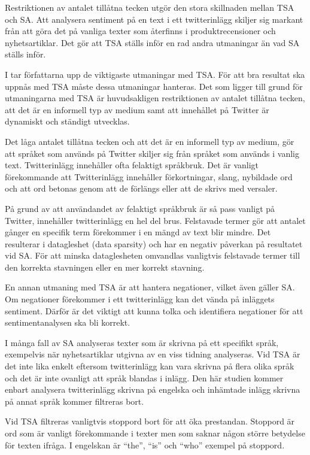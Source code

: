 \documentclass{kaumasters} %
\begin{document}
Restriktionen av antalet tillåtna tecken utgör den stora skillnaden mellan TSA och SA. Att analysera sentiment på en text i ett twitterinlägg skiljer sig markant från att göra det på vanliga texter som återfinns i produktrecensioner och nyhetsartiklar. Det gör att TSA ställs inför en rad andra utmaningar än vad SA ställs inför.

I \cite{TSAsurvey} tar författarna upp de viktigaste utmaningar med TSA. För att bra resultat ska uppnås med TSA måste dessa utmaningar hanteras. Det som ligger till grund för utmaningarna med TSA är huvudsakligen restriktionen av antalet tillåtna tecken, att det är en informell typ av medium samt att innehållet på Twitter är dynamiskt och ständigt utvecklas.

Det låga antalet tillåtna tecken och att det är en informell typ av medium, gör att språket som används på Twitter skiljer sig från språket som används i vanlig text. Twitterinlägg innehåller ofta felaktigt språkbruk. Det är vanligt förekommande att Twitterinlägg innehåller förkortningar, slang,  nybildade ord och att ord betonas genom att de förlängs eller att de skrivs med versaler. 

På grund av att användandet av felaktigt språkbruk är så pass vanligt på Twitter, innehåller twitterinlägg en hel del brus. Felstavade termer gör att antalet gånger en specifik term förekommer i en mängd av text blir mindre. Det resulterar i datagleshet (data sparsity) och har en negativ påverkan på resultatet vid SA. För att minska dataglesheten omvandlas vanligtvis felstavade termer till den korrekta stavningen eller en mer korrekt stavning.

En annan utmaning med TSA är att hantera negationer, vilket även gäller SA. Om negationer förekommer i ett twitterinlägg kan det vända på inläggets sentiment. Därför är det viktigt att kunna tolka och identifiera negationer för att sentimentanalysen ska bli korrekt.

I många fall av SA analyseras texter som är skrivna på ett specifikt språk, exempelvis när nyhetsartiklar utgivna av en viss tidning analyseras. Vid TSA är det inte lika enkelt eftersom twitterinlägg kan vara skrivna på flera olika språk och det är inte ovanligt att språk blandas i inlägg. Den här studien kommer enbart analysera twitterinlägg skrivna på engelska och inhämtade inlägg skrivna på annat språk kommer filtreras bort. 

Vid TSA filtreras vanligtvis stoppord bort för att öka prestandan. Stoppord är ord som är vanligt förekommande i texter men som saknar någon större betydelse för texten ifråga. I engelskan är “the”, “is” och “who” exempel på stoppord.
\end{document}
